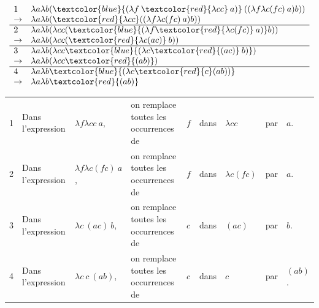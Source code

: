 \begin{myexem}
$$\begin{array}{ll}
	1 &\lambda a \lambda b ( \textcolor{blue}{(\lambda f \: \textcolor{red}{\lambda c c} \: a)} \: (( \lambda f \lambda c (f c)\: a) b))\\
	\rightarrow &\lambda a \lambda b ( \textcolor{red}{\lambda c c} (( \lambda f \lambda c (f c)\: a) b))\\
	\hline
	2 &\lambda a \lambda b ( \lambda c c (\textcolor{blue}{( \lambda f \textcolor{red}{\lambda c (f c)}\: a)} b))\\
	\rightarrow &\lambda a \lambda b ( \lambda c c ( \textcolor{red}{\lambda c (a c)}\: b))\\
	\hline
	3 &\lambda a \lambda b ( \lambda c c \textcolor{blue}{( \lambda c \textcolor{red}{(a c)}\: b)})\\
	\rightarrow &\lambda a \lambda b ( \lambda c c  \textcolor{red}{(a b)} )\\
	\hline
	4 &\lambda a \lambda b \textcolor{blue}{( \lambda c \textcolor{red}{c}  (a b) )}\\
	\rightarrow &\lambda a \lambda b  \textcolor{red}{(a b)} \\

\end{array}$$
\begin{tabular}{lllllllll}
	1 & Dans l'expression & $\lambda f \lambda c c \:a$,& on remplace toutes les occurrences de & $f$ & dans & $\lambda c c$ & par & $a$.\\
	2 & Dans l'expression & $\lambda f \lambda c (f c)\: a$,& on remplace toutes les occurrences de & $f$ & dans & $\lambda c (f c)$ & par & $a$.\\
	3 & Dans l'expression & $\lambda c\: (a c)\: b$,& on remplace toutes les occurrences de & $c$ & dans & $(a c)$ & par & $b$.\\
	4 & Dans l'expression & $\lambda c \:c \:  (a b)$,& on remplace toutes les occurrences de & $c$ & dans & $c$ & par & $(a b)$.\\
\end{tabular}
\end{myexem}
